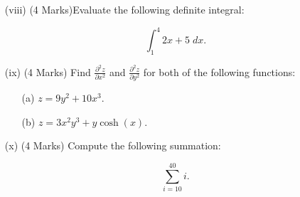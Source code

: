 \documentclass[a4paper,12pt]{article}
\begin{document}
\begin{itemize}
\begin{multicols}{2}
\begin{itemize}
	\end{itemize}
	\end{multicols}

	\smallskip
	\item[(viii)] (4 Marks)Evaluate the following definite integral:
	
	\[  \int^{4}_{1}  2x+5\; dx.  \]
	\smallskip

	
%	
	
	
	\item[(ix)] (4 Marks) Find $\displaystyle{ \frac{ \partial^2 z }{ \partial x^2 }}$ and $\displaystyle{ \frac{ \partial^2 z }{ \partial y^2 }}$  for both of the following functions:
\smallskip
	\begin{multicols}{2}
		\begin{itemize}
			\item[(a)] $\displaystyle{  z = 9y^2 +10x^3. }  $
				\item[(b)] $\displaystyle{  z = 3x^2y^3 + y\cosh(x).}$
				
			\end{itemize}
		\end{multicols}
		\medskip
	\item[(x)] (4 Marks)  Compute the following summation:
	
	\[ \sum_{i=10}^{40} i . \]
\end{itemize}





	

	
%		
%
%
%		
%
\end{document}
